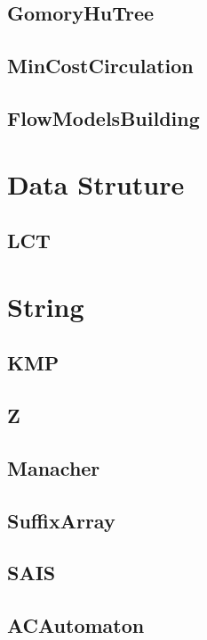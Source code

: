 	\subsection{GomoryHuTree}
	
	\subsection{MinCostCirculation}
	
	\subsection{FlowModelsBuilding}
	
\section{Data Struture}
	\subsection{LCT}
	
\section{String}
	\subsection{KMP}
	
	\subsection{Z}
	
	\subsection{Manacher}
	
	\subsection{SuffixArray}
	
	\subsection{SAIS}
	
	\subsection{ACAutomaton}
	
